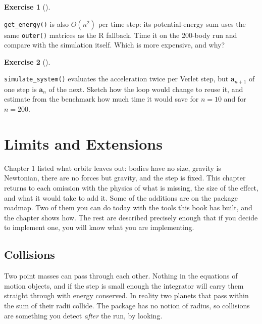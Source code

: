 \documentclass[
  10.5pt,
  letterpaper,
]{scrbook}
\theoremstyle{definition}
\newtheorem{exercise}{Exercise}[chapter]
\theoremstyle{plain}
\theoremstyle{remark}
\begin{document}
\begin{exercise}[]\protect\hypertarget{exr-ch15-energy-cost}{}\label{exr-ch15-energy-cost}

\texttt{get\_energy()} is also \(O(n^2)\) per time step: its
potential-energy sum uses the same \texttt{outer()} matrices as the R
fallback. Time it on the 200-body run and compare with the simulation
itself. Which is more expensive, and why?

\end{exercise}

\begin{exercise}[]\protect\hypertarget{exr-ch15-verlet-cost}{}\label{exr-ch15-verlet-cost}

\texttt{simulate\_system()} evaluates the acceleration twice per Verlet
step, but \(\mathbf{a}_{n+1}\) of one step is \(\mathbf{a}_n\) of the
next. Sketch how the loop would change to reuse it, and estimate from
the benchmark how much time it would save for \(n = 10\) and for
\(n = 200\).

\end{exercise}

\chapter{Limits and Extensions}\label{sec-limits}

Chapter 1 listed what orbitr leaves out: bodies have no size, gravity is
Newtonian, there are no forces but gravity, and the step is fixed. This
chapter returns to each omission with the physics of what is missing,
the size of the effect, and what it would take to add it. Some of the
additions are on the package roadmap. Two of them you can do today with
the tools this book has built, and the chapter shows how. The rest are
described precisely enough that if you decide to implement one, you will
know what you are implementing.

\section{Collisions}\label{collisions}

Two point masses can pass through each other. Nothing in the equations
of motion objects, and if the step is small enough the integrator will
carry them straight through with energy conserved. In reality two
planets that pass within the sum of their radii collide. The package has
no notion of radius, so collisions are something you detect \emph{after}
the run, by looking.
\end{document}
